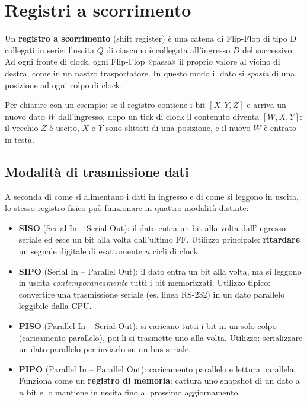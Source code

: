 \documentclass[11pt,a4paper]{report}
\begin{document}
\section{Registri a scorrimento}

Un \textbf{registro a scorrimento} (shift register) è una catena di Flip-Flop di tipo D collegati in serie: l'uscita $Q$ di ciascuno è collegata all'ingresso $D$ del successivo. Ad ogni fronte di clock, ogni Flip-Flop «passa» il proprio valore al vicino di destra, come in un nastro trasportatore. In questo modo il dato si \emph{sposta} di una posizione ad ogni colpo di clock.

\vspace{2mm}
\noindent Per chiarire con un esempio: se il registro contiene i bit $[X, Y, Z]$ e arriva un nuovo dato $W$ dall'ingresso, dopo un tick di clock il contenuto diventa $[W, X, Y]$: il vecchio $Z$ è uscito, $X$ e $Y$ sono slittati di una posizione, e il nuovo $W$ è entrato in testa.

\subsection{Modalità di trasmissione dati}

A seconda di come si alimentano i dati in ingresso e di come si leggono in uscita, lo stesso registro fisico può funzionare in quattro modalità distinte:

\begin{itemize}[leftmargin=1.5em]
    \item \textbf{SISO} (Serial In -- Serial Out): il dato entra un bit alla volta dall'ingresso seriale ed esce un bit alla volta dall'ultimo FF. Utilizzo principale: \textbf{ritardare} un segnale digitale di esattamente $n$ cicli di clock.
    \item \textbf{SIPO} (Serial In -- Parallel Out): il dato entra un bit alla volta, ma si leggono in uscita \emph{contemporaneamente} tutti i bit memorizzati. Utilizzo tipico: convertire una trasmissione seriale (es. linea RS-232) in un dato parallelo leggibile dalla CPU.
    \item \textbf{PISO} (Parallel In -- Serial Out): si caricano tutti i bit in un solo colpo (caricamento parallelo), poi li si trasmette uno alla volta. Utilizzo: serializzare un dato parallelo per inviarlo su un bus seriale.
    \item \textbf{PIPO} (Parallel In -- Parallel Out): caricamento parallelo e lettura parallela. Funziona come un \textbf{registro di memoria}: cattura uno snapshot di un dato a $n$ bit e lo mantiene in uscita fino al prossimo aggiornamento.
\end{itemize}
\end{document}
